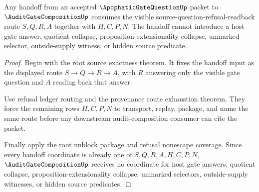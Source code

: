 \begin{theorem}
\label{thm:apophatic-gate-question-auditgate-composition-boundary-lock}
Any handoff from an accepted $\ApophaticGateQuestionUp$ packet to $\AuditGateCompositionUp$ consumes the visible source-question-refusal-readback route $S,Q,R,A$ together with $H,C,P,N$. The handoff cannot introduce a host gate answer, quotient collapse, proposition-extensionality collapse, unmarked selector, outside-supply witness, or hidden source predicate.
\end{theorem}
\begin{proof}
Begin with the root source exactness theorem. It fixes the handoff input as the displayed route $S \to Q \to R \to A$, with $R$ answering only the visible gate question and $A$ reading back that answer.

Use refusal ledger routing and the provenance route exhaustion theorem. They force the remaining rows $H,C,P,N$ to transport, replay, package, and name the same route before any downstream audit-composition consumer can cite the packet.

Finally apply the root unblock package and refusal nonescape coverage. Since every handoff coordinate is already one of $S,Q,R,A,H,C,P,N$, $\AuditGateCompositionUp$ receives no coordinate for host gate answers, quotient collapse, proposition-extensionality collapse, unmarked selectors, outside-supply witnesses, or hidden source predicates.
\end{proof}
